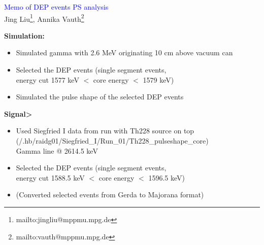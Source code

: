 \documentclass[landscape]{slides}
\begin{document}
\begin{slide}
\begin{center}
\textcolor{blue}{Memo of DEP events PS analysis}\\
Jing Liu\footnote{mailto:jingliu@mppmu.mpg.de},
Annika Vauth\footnote{mailto:vauth@mppmu.mpg.de}

\end{center}

\end{slide}


\begin{slide}

\textbf{Simulation:}

\begin{itemize}

\item Simulated gamma with 2.6 MeV originating 10 cm above vacuum can

\item Selected the DEP events (single segment events,
	\\ energy cut 1577 keV $<$ core energy $<$ 1579 keV)

\item Simulated the pulse shape of the selected DEP events

\end{itemize}

\end{slide}

\begin{slide}

\textbf{Signal>}

\begin{itemize}

\item Used Siegfried I data from run with Th228 source on top
	\\ (/.hb/raidg01/Siegfried\_I/Run\_01/Th228\_pulseshape\_core)
	\\ Gamma line @ 2614.5 keV

\item Selected the DEP events (single segment events,
	\\ energy cut 1588.5 keV $<$ core energy $<$ 1596.5 keV)

\item (Converted selected events from Gerda to Majorana format)

\end{itemize}

\end{slide}
\end{document}
